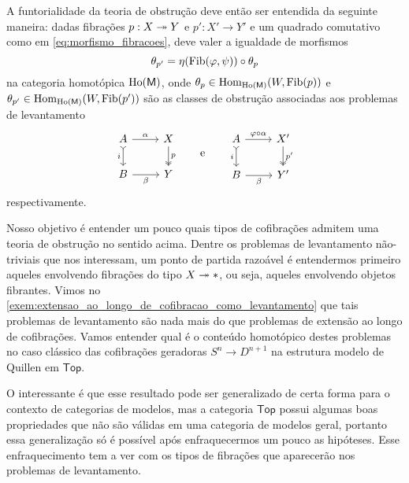 \begin{obs}
  A funtorialidade da teoria de obstrução deve então ser entendida da seguinte maneira: dadas fibrações $p: X \twoheadrightarrow Y$ e $p': X' \to Y'$ e um quadrado comutativo como em \eqref{eq:morfismo_fibracoes}, deve valer a igualdade de morfismos
  \begin{displaymath}
    \theta_{p'} = \eta(\mathrm{Fib}(\varphi,\psi)) \circ \theta_{p}
  \end{displaymath}
  na categoria homotópica $\mathrm{Ho}(\mathsf{M})$, onde $\theta_{p} \in \mathrm{Hom}_{\mathrm{Ho}(\mathsf{M})}(W,\mathrm{Fib}(p))$ e $\theta_{p'} \in \mathrm{Hom}_{\mathrm{Ho}(\mathsf{M})}(W,\mathrm{Fib}(p'))$ são as classes de obstrução associadas aos problemas de levantamento
  \begin{displaymath}
    \begin{tikzcd}
      A
      \arrow[r, "\alpha"]
      \arrow[d, tail, "i" swap]
      & X
      \arrow[d, two heads, "p"]
      \\ B
      \arrow[r, "\beta" swap]
      & Y
    \end{tikzcd}
    \qquad \text{e} \qquad
    \begin{tikzcd}
      A
      \arrow[r, "\varphi \circ \alpha"]
      \arrow[d, tail ,"i" swap]
      & X'
      \arrow[d, two heads, "p'"]
      \\ B
      \arrow[r, "\beta" swap]
      & Y'
    \end{tikzcd}
  \end{displaymath}
  respectivamente.
\end{obs}

Nosso objetivo é entender um pouco quais tipos de cofibrações admitem uma teoria de obstrução no sentido acima.
Dentre os problemas de levantamento não-triviais que nos interessam, um ponto de partida razoável é entendermos primeiro aqueles envolvendo fibrações do tipo $X \twoheadrightarrow *$, ou seja, aqueles envolvendo objetos fibrantes.
Vimos no \cref{exem:extensao_ao_longo_de_cofibracao_como_levantamento} que tais problemas de levantamento são nada mais do que problemas de extensão ao longo de cofibrações.
Vamos entender qual é o conteúdo homotópico destes problemas no caso clássico das cofibrações geradoras $S^n \to D^{n+1}$ na estrutura modelo de Quillen em $\mathsf{Top}$.

O interessante é que esse resultado pode ser generalizado de certa forma para o contexto de categorias de modelos, mas a categoria $\mathsf{Top}$ possui algumas boas propriedades que não são válidas em uma categoria de modelos geral, portanto essa generalização só é possível após enfraquecermos um pouco as hipóteses.
Esse enfraquecimento tem a ver com os tipos de fibrações que aparecerão nos problemas de levantamento.


